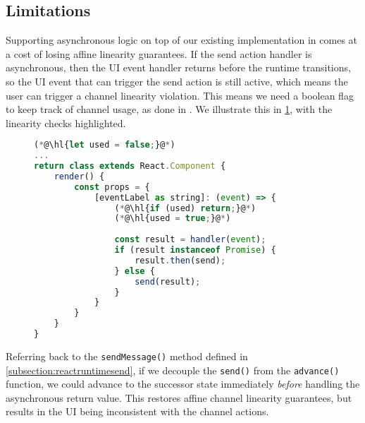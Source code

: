 \subsection{Limitations}
\label{subsection:asynclimit}

Supporting asynchronous logic on top of our
existing implementation in  comes at a cost
of losing affine linearity guarantees.
If the send action handler is asynchronous, then the UI event handler
returns before the runtime transitions, so the UI event that can trigger
the send action is still active, which means the user can trigger
a channel linearity violation. This means we need a boolean flag
to keep track of channel usage, as done in \cite{Hybrid2016}.
We illustrate this in \cref{lst:asynclinearcheck},
with the linearity checks highlighted.

\begin{figure}[!h]
\begin{lstlisting}[language=javascript]
(*@\hl{let used = false;}@*)
...
return class extends React.Component {
	render() {
		const props = {
			[eventLabel as string]: (event) => {
				(*@\hl{if (used) return;}@*)
				(*@\hl{used = true;}@*)
				
				const result = handler(event);
				if (result instanceof Promise) {
					result.then(send);
				} else {
					send(result);
				}
			}		
		}
	}
}
\end{lstlisting}
\label{lst:asynclinearcheck}
\end{figure}

Referring back to the \texttt{sendMessage()} method
defined in \cref{subsection:reactruntimesend},
if we decouple the \texttt{send()} 
from the \texttt{advance()} function, we could advance to the successor state
immediately \textit{before} handling the asynchronous return value.
This restores affine channel linearity guarantees, but 
results in the UI being inconsistent with the channel
actions.